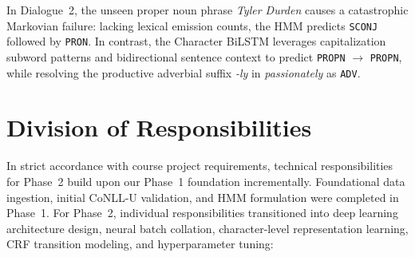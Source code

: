 \documentclass[conference]{IEEEtran}
\begin{document}
In Dialogue~2, the unseen proper noun phrase \textit{Tyler Durden} causes a catastrophic Markovian failure: lacking lexical emission counts, the HMM predicts \texttt{SCONJ} followed by \texttt{PRON}. In contrast, the Character BiLSTM leverages capitalization subword patterns and bidirectional sentence context to predict \texttt{PROPN} $\rightarrow$ \texttt{PROPN}, while resolving the productive adverbial suffix \textit{-ly} in \textit{passionately} as \texttt{ADV}.

\section{Division of Responsibilities}
\label{sec:division}
In strict accordance with course project requirements, technical responsibilities for Phase~2 build upon our Phase~1 foundation incrementally. Foundational data ingestion, initial CoNLL-U validation, and HMM formulation were completed in Phase~1. For Phase~2, individual responsibilities transitioned into deep learning architecture design, neural batch collation, character-level representation learning, CRF transition modeling, and hyperparameter tuning:
\end{document}
